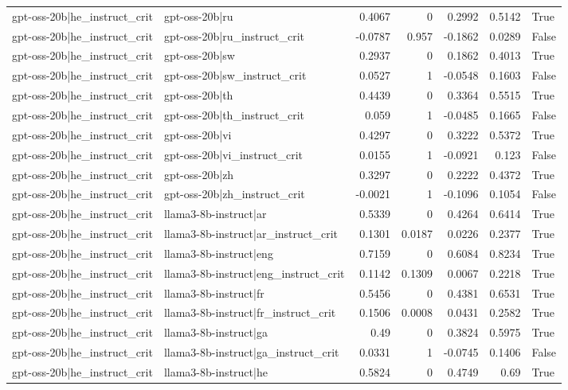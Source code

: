 \begin{table}
\begin{tabular}{l l r r r r l}
gpt-oss-20b|he_instruct_crit & gpt-oss-20b|ru & 0.4067 & 0 & 0.2992 & 0.5142 & True \\
gpt-oss-20b|he_instruct_crit & gpt-oss-20b|ru_instruct_crit & -0.0787 & 0.957 & -0.1862 & 0.0289 & False \\
gpt-oss-20b|he_instruct_crit & gpt-oss-20b|sw & 0.2937 & 0 & 0.1862 & 0.4013 & True \\
gpt-oss-20b|he_instruct_crit & gpt-oss-20b|sw_instruct_crit & 0.0527 & 1 & -0.0548 & 0.1603 & False \\
gpt-oss-20b|he_instruct_crit & gpt-oss-20b|th & 0.4439 & 0 & 0.3364 & 0.5515 & True \\
gpt-oss-20b|he_instruct_crit & gpt-oss-20b|th_instruct_crit & 0.059 & 1 & -0.0485 & 0.1665 & False \\
gpt-oss-20b|he_instruct_crit & gpt-oss-20b|vi & 0.4297 & 0 & 0.3222 & 0.5372 & True \\
gpt-oss-20b|he_instruct_crit & gpt-oss-20b|vi_instruct_crit & 0.0155 & 1 & -0.0921 & 0.123 & False \\
gpt-oss-20b|he_instruct_crit & gpt-oss-20b|zh & 0.3297 & 0 & 0.2222 & 0.4372 & True \\
gpt-oss-20b|he_instruct_crit & gpt-oss-20b|zh_instruct_crit & -0.0021 & 1 & -0.1096 & 0.1054 & False \\
gpt-oss-20b|he_instruct_crit & llama3-8b-instruct|ar & 0.5339 & 0 & 0.4264 & 0.6414 & True \\
gpt-oss-20b|he_instruct_crit & llama3-8b-instruct|ar_instruct_crit & 0.1301 & 0.0187 & 0.0226 & 0.2377 & True \\
gpt-oss-20b|he_instruct_crit & llama3-8b-instruct|eng & 0.7159 & 0 & 0.6084 & 0.8234 & True \\
gpt-oss-20b|he_instruct_crit & llama3-8b-instruct|eng_instruct_crit & 0.1142 & 0.1309 & 0.0067 & 0.2218 & True \\
gpt-oss-20b|he_instruct_crit & llama3-8b-instruct|fr & 0.5456 & 0 & 0.4381 & 0.6531 & True \\
gpt-oss-20b|he_instruct_crit & llama3-8b-instruct|fr_instruct_crit & 0.1506 & 0.0008 & 0.0431 & 0.2582 & True \\
gpt-oss-20b|he_instruct_crit & llama3-8b-instruct|ga & 0.49 & 0 & 0.3824 & 0.5975 & True \\
gpt-oss-20b|he_instruct_crit & llama3-8b-instruct|ga_instruct_crit & 0.0331 & 1 & -0.0745 & 0.1406 & False \\
gpt-oss-20b|he_instruct_crit & llama3-8b-instruct|he & 0.5824 & 0 & 0.4749 & 0.69 & True \\

\end{tabular}
\end{table}
